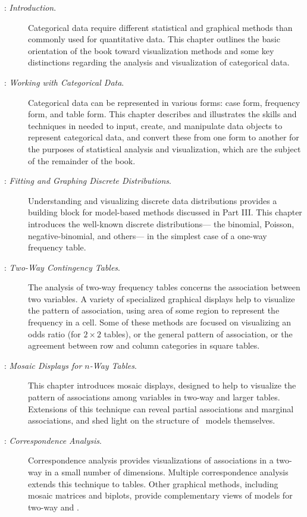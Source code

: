 \begin{description}
\item[: \emph{Introduction}.]
Categorical data require different statistical and graphical methods
than commonly used for quantitative data.
This chapter outlines the basic orientation
of the book toward visualization methods and some key distinctions regarding the
analysis and visualization of categorical data.

\item[: \emph{Working with Categorical Data}.]
Categorical data can be represented in various forms:
case form, frequency form, and table form.  This chapter
describes and illustrates the skills and techniques in \R
needed to input, create, and manipulate \R data objects
to represent categorical data, and convert these from one
form to another for the purposes of statistical analysis
and visualization, which are the subject of the remainder of the book.

\item[: \emph{Fitting and Graphing Discrete Distributions}.]
Understanding and visualizing discrete data distributions provides a
building block for model-based methods discussed in Part III.
This chapter introduces the well-known discrete distributions---%
the binomial, Poisson, negative-binomial, and others---%
in the simplest case of a one-way frequency table.

\item[: \emph{Two-Way Contingency Tables}.]
The analysis of two-way frequency tables concerns the association
between two variables.  A variety of specialized graphical
displays help to visualize the pattern of association,
using area of some region to represent the frequency in a cell.
Some of these methods are focused
on visualizing an odds ratio (for $2 \times 2$ tables), or the general
pattern of association, or the agreement between row and column
categories in square tables.

\item[: \emph{Mosaic Displays for $n$-Way Tables}.]
This chapter introduces mosaic displays, designed to
help to visualize the pattern of associations
among variables in two-way and larger tables.  
Extensions of
this technique can reveal partial associations and marginal associations,
and shed light on the structure of \loglin\ models themselves.

\item[: \emph{Correspondence Analysis}.]
Correspondence analysis provides visualizations of associations in a two-way \ctab
in a small number of dimensions.
Multiple correspondence analysis extends this technique to \nway
tables.  Other graphical methods, including mosaic matrices and biplots,
provide complementary views of \loglin models for two-way and \nway
\ctabs.


\end{description}
